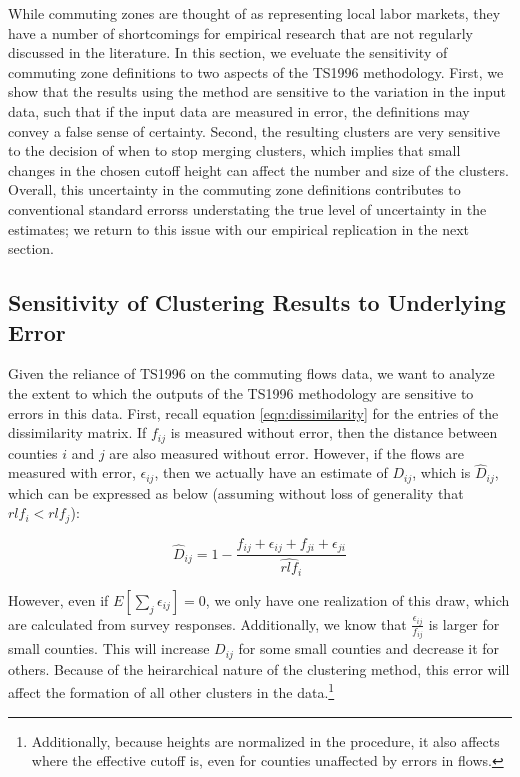 While commuting zones are thought of as representing local labor markets, they have a number of shortcomings for empirical research that are not regularly discussed in the literature. In this section, we eveluate the sensitivity of commuting zone definitions to two aspects of the TS1996 methodology. First, we show that the results using the method are sensitive to the variation in the input data, such that if the input data are measured in error, the definitions may convey a false sense of certainty. Second, the resulting clusters are very sensitive to the decision of when to stop merging clusters, which implies that small changes in the chosen cutoff height can affect the number and size of the clusters. Overall, this uncertainty in the commuting zone definitions contributes to conventional standard errorss understating the true level of uncertainty in the estimates; we return to this issue with our empirical replication in the next section.

\subsection{Sensitivity of Clustering Results to Underlying Error}

Given the reliance of TS1996 on the commuting flows data, we want to analyze the extent to which the outputs of the TS1996 methodology are sensitive to errors in this data. First, recall equation \ref{eqn:dissimilarity} for the entries of the dissimilarity matrix. If $f_{ij}$ is measured without error, then the distance between counties $i$ and $j$ are also measured without error. However, if the flows are measured with error, $\epsilon_{ij}$, then we actually have an estimate of $D_{ij}$, which is $\hat{D}_{ij}$, which can be expressed as below (assuming without loss of generality that $rlf_i < rlf_j$):

\begin{equation}
\hat{D}_{ij} = 1 - \frac{f_{ij} + \epsilon_{ij} + f_{ji} + \epsilon_{ji}}{\hat{rlf}_i}
\end{equation}

However, even if $E[\sum_j \epsilon_{ij}]=0$, we only have one realization of this draw, which are calculated from survey responses. Additionally, we know that $\frac{\epsilon_{ij}}{f_{ij}}$ is larger for small counties. This will increase $D_{ij}$ for some small counties and decrease it for others. Because of the heirarchical nature of the clustering method, this error will affect the formation of all other clusters in the data.\footnote{Additionally, because heights are normalized in the procedure, it also affects where the effective cutoff is, even for counties unaffected by errors in flows.}

